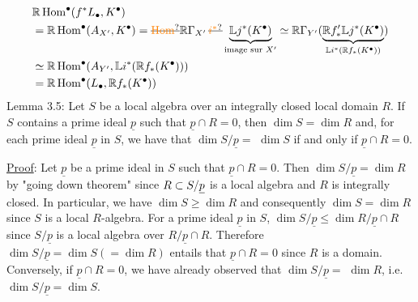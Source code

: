 \[
\begin{aligned}
&\mathbb R\operatorname{Hom}^\bullet(f^*L_\bullet,K^\bullet)\\
&=\mathbb R\operatorname{Hom}^\bullet(A_{X'},K^\bullet)
=\deleted{\unsure{\operatorname{Hom}}}\mathbb R\Gamma_{X'}\,\deleted{\unsure{i^*}}\underbrace{\mathbb L j^*(K^\bullet)}_{\text{image sur }X'}
\simeq \mathbb R\Gamma_{Y'}(\underbrace{\mathbb R f'_*\mathbb L j^*(K^\bullet)}_{\mathbb L i^*(\mathbb R f_*(K^\bullet))})\\
&\simeq\mathbb R\operatorname{Hom}^\bullet(A_{Y'},\mathbb L i^*(\mathbb R f_*(K^\bullet)))\\
&=\mathbb R\operatorname{Hom}^\bullet(L_\bullet,\mathbb R f_*(K^\bullet))
\end{aligned}
\]
Lemma 3.5: Let $S$ be a local algebra over an integrally closed local
domain $R$. If $S$ contains a prime ideal $\underline p$ such that $\underline p\cap R=0$, then
$\dim S=\dim R$ and, for each prime ideal $\underline p$ in $S$, we have that $\dim S/\underline p=$
$\dim S$ if and only if $\underline p\cap R=0$.

\uline{Proof}: Let $\underline p$ be a prime ideal in $S$ such that $\underline p\cap R=0$. Then
$\dim S/\underline p=\dim R$ by "going down theorem" since $R\subset S/\underline p$ is a local algebra
and $R$ is integrally closed. In particular, we have $\dim S\geq\dim R$ and
consequently $\dim S=\dim R$ since $S$ is a local $R$-algebra. For a prime ideal
$\underline p$ in $S$, $\dim S/\underline p\leq\dim R/\underline p\cap R$ since $S/\underline p$ is a local algebra over $R/\underline p\cap R$.
Therefore $\dim S/\underline p=\dim S(=\dim R)$ entails that $\underline p\cap R=0$ since $R$ is a
domain. Conversely, if $\underline p\cap R=0$, we have already observed that $\dim S/\underline p=$
$\dim R$, i.e. $\dim S/\underline p=\dim S$.\hfill\unsure{;|:}


